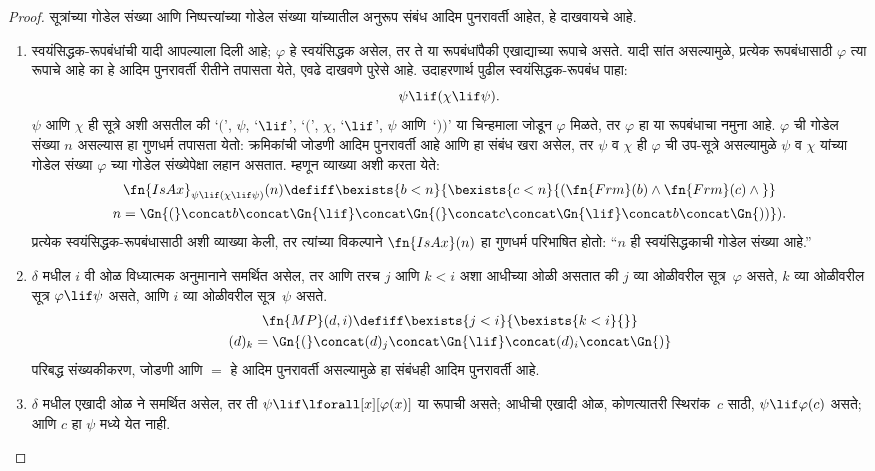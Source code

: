 \begin{proof}
सूत्रांच्या गोडेल संख्या आणि निष्पत्त्यांच्या
गोडेल संख्या यांच्यातील अनुरूप संबंध आदिम पुनरावर्ती आहेत,
हे दाखवायचे आहे.
\begin{enumerate}
\item स्वयंसिद्धक-रूपबंधांची यादी आपल्याला दिली आहे; $\varphi$ हे
  स्वयंसिद्धक असेल, तर ते या रूपबंधांपैकी एखाद्याच्या रूपाचे असते.
  यादी सांत असल्यामुळे, प्रत्येक रूपबंधासाठी $\varphi$ त्या रूपाचे
  आहे का हे आदिम पुनरावर्ती रीतीने तपासता येते, एवढे दाखवणे पुरेसे आहे.
  उदाहरणार्थ पुढील स्वयंसिद्धक-रूपबंध पाहा:
  \[  \psi \lif (\chi \lif \psi).
  \]
  $\psi$ आणि $\chi$ ही सूत्रे अशी असतील की `$($', $\psi$,
  `$\lif$', `$($', $\chi$, `$\lif$', $\psi$ आणि~`$))$' या
  चिन्हमाला जोडून $\varphi$ मिळते, तर $\varphi$ हा या रूपबंधाचा नमुना आहे.
  $\varphi$ ची गोडेल संख्या $n$ असल्यास हा गुणधर्म तपासता येतो:
  क्रमिकांची जोडणी आदिम पुनरावर्ती आहे आणि हा संबंध खरा असेल,
  तर $\psi$ व $\chi$ ही $\varphi$ ची उप-सूत्रे असल्यामुळे $\psi$ व $\chi$
  यांच्या गोडेल संख्या $\varphi$ च्या गोडेल संख्येपेक्षा लहान असतात.
  म्हणून व्याख्या अशी करता येते:
  \begin{multline*}
  \fn{IsAx}_{\psi \lif (\chi \lif \psi)}(n) \defiff \bexists{b< n}{
    \bexists{c < n}{(\fn{Frm}(b) \land \fn{Frm}(c) \land {}}}\\ n =
  \Gn{(} \concat b \concat \Gn{\lif} \concat \Gn{(} \concat c \concat
  \Gn{\lif} \concat b \concat \Gn{))}).
  \end{multline*}
  प्रत्येक स्वयंसिद्धक-रूपबंधासाठी अशी व्याख्या केली, तर
  त्यांच्या विकल्पाने $\fn{IsAx}(n)$ हा गुणधर्म परिभाषित होतो:
  ``$n$ ही स्वयंसिद्धकाची गोडेल संख्या आहे.''
\item $\delta$ मधील $i$ वी ओळ विध्यात्मक अनुमानाने समर्थित असेल,
  तर आणि तरच $j$ आणि $k < i$ अशा आधीच्या ओळी असतात की
  $j$ व्या ओळीवरील सूत्र~$\varphi$ असते,
  $k$ व्या ओळीवरील सूत्र $\varphi \lif \psi$ असते, आणि
  $i$ व्या ओळीवरील सूत्र~$\psi$ असते.
  \begin{multline*}
    \fn{MP}(d, i) \defiff \bexists{j < i}{\bexists{k < i}{}}\\
    (d)_k = \Gn{(} \concat (d)_j
      \concat \Gn{\lif} \concat (d)_i \concat \Gn{)}
  \end{multline*}
  परिबद्ध संख्यकीकरण, जोडणी आणि $=$ हे आदिम पुनरावर्ती
  असल्यामुळे हा संबंधही आदिम पुनरावर्ती आहे.
\item $\delta$ मधील एखादी ओळ \QR{} ने समर्थित असेल,
  तर ती $\psi \lif \lforall[x][\varphi(x)]$ या रूपाची असते;
  आधीची एखादी ओळ, कोणत्यातरी स्थिरांक~$c$ साठी,
  $\psi \lif \varphi(c)$ असते; आणि $c$ हा $\psi$ मध्ये येत नाही.

\end{enumerate}
\end{proof}
